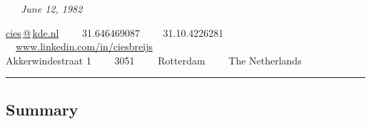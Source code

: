 \documentclass[10pt,a4paper]{article}
\begin{document}

\ \ \ \emph{June 12, 1982}

\vspace{0.3em}
\hspace{-\parindent}\href{mailto:cies at kde.nl}{cies$\,\!$@$\,\!$kde.nl}\ \ \textbullet  %
\ \ \textsmaller{+}31.646469087\ \ \textbullet
\ \ \textsmaller{+}31.10.4226281\ \ \textbullet
\ \ \href{http://www.linkedin.com/in/ciesbreijs}{www.linkedin.com/in/ciesbreijs}
\\
Akkerwindestraat 1\ \ \textbullet
\ \ 3051\ \ \textbullet
\ \ Rotterdam\ \ \textbullet
\ \ The Netherlands
\vspace{0.9em}


\hrule \vspace{-0.4em} \subsection*{Summary}
\end{document}
